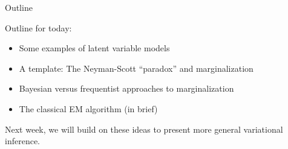 
\begin{frame}{Outline}

Outline for today:

\begin{itemize}
    \item Some examples of latent variable models
    \item A template: The Neyman-Scott ``paradox'' and marginalization
    \item Bayesian versus frequentist approaches to marginalization
    \item The classical EM algorithm (in brief)
\end{itemize}

Next week, we will build on these ideas to present more general variational
inference.

\end{frame}
